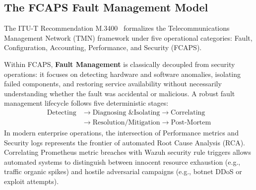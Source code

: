 \subsection{The FCAPS Fault Management Model}
The ITU-T Recommendation M.3400~\citep{itu_fcaps} formalizes the Telecommunications Management Network (TMN) framework under five operational categories: Fault, Configuration, Accounting, Performance, and Security (FCAPS). 

Within FCAPS, \textbf{Fault Management} is classically decoupled from security operations: it focuses on detecting hardware and software anomalies, isolating failed components, and restoring service availability without necessarily understanding whether the fault was accidental or malicious. A robust fault management lifecycle follows five deterministic stages:
\begin{equation}
\begin{aligned}
    \text{Detecting} &\longrightarrow \text{Diagnosing \& Isolating} \longrightarrow \text{Correlating} \\
    &\longrightarrow \text{Resolution/Mitigation} \longrightarrow \text{Post-Mortem}
\end{aligned}
\end{equation}
In modern enterprise operations, the intersection of Performance metrics and Security logs represents the frontier of automated Root Cause Analysis (RCA). Correlating Prometheus metric breaches with Wazuh security rule triggers allows automated systems to distinguish between innocent resource exhaustion (e.g., traffic organic spikes) and hostile adversarial campaigns (e.g., botnet DDoS or exploit attempts).
